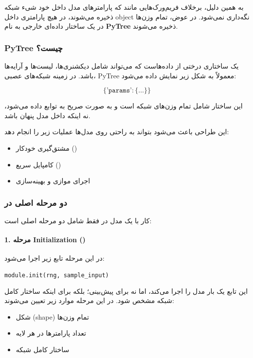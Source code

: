 \documentclass{article}
\begin{document}
به همین دلیل، برخلاف فریم‌ورک‌هایی مانند  که پارامترهای مدل داخل خود شیء شبکه ذخیره می‌شوند، در  هیچ پارامتری داخل object نگه‌داری نمی‌شود. در عوض، تمام وزن‌ها در یک ساختار داده‌ای خارجی به نام \textbf{PyTree} ذخیره می‌شوند.

\subsubsection*{PyTree چیست؟}

یک  ساختاری درختی از داده‌هاست که می‌تواند شامل دیکشنری‌ها، لیست‌ها و آرایه‌ها باشد. در زمینه شبکه‌های عصبی، PyTree معمولاً به شکل زیر نمایش داده می‌شود:

\[
\{\texttt{'params'} : \{\ldots\}\}
\]

این ساختار شامل تمام وزن‌های شبکه است و به صورت صریح به توابع داده می‌شود، نه اینکه داخل مدل پنهان باشد.

این طراحی باعث می‌شود  بتواند به راحتی روی مدل‌ها عملیات زیر را انجام دهد:

\begin{itemize}
	\item مشتق‌گیری خودکار ()
	\item کامپایل سریع ()
	\item اجرای موازی و بهینه‌سازی
\end{itemize}

\subsubsection*{دو مرحله اصلی در }

کار با یک مدل در  فقط شامل دو مرحله اصلی است:

\paragraph{1. مرحله Initialization ()}

در این مرحله تابع زیر اجرا می‌شود:

\begin{latin}
	\texttt{module.init(rng, sample\_input)}
\end{latin}

این تابع یک بار مدل را اجرا می‌کند، اما نه برای پیش‌بینی؛ بلکه برای اینکه ساختار کامل شبکه مشخص شود. در این مرحله موارد زیر تعیین می‌شوند:

\begin{itemize}
	\item شکل (shape) تمام وزن‌ها
	\item تعداد پارامترها در هر لایه
	\item ساختار کامل شبکه
\end{itemize}
\end{document}
